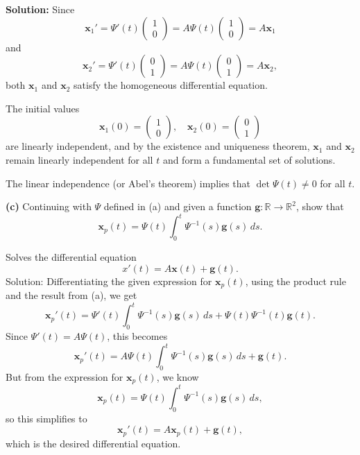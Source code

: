 \documentclass[10pt,landscape]{article}
\newcommand{\mbf}{\mathbf}
\begin{document}
\begin{multicols}{2}
\textbf{Solution:}  
Since\\
\[
\mbf{x}_1' = \Psi'(t) \begin{pmatrix} 1 \\ 0 \end{pmatrix} = A \Psi(t) \begin{pmatrix} 1 \\ 0 \end{pmatrix} = A \mbf{x}_1
\]
and\\
\[
\mbf{x}_2' = \Psi'(t) \begin{pmatrix} 0 \\ 1 \end{pmatrix} = A \Psi(t) \begin{pmatrix} 0 \\ 1 \end{pmatrix} = A \mbf{x}_2,
\]
both \( \mbf{x}_1 \) and \( \mbf{x}_2 \) satisfy the homogeneous differential equation.  

The initial values\\
\[
\mbf{x}_1(0) = \begin{pmatrix} 1 \\ 0 \end{pmatrix}, \quad \mbf{x}_2(0) = \begin{pmatrix} 0 \\ 1 \end{pmatrix}
\]
are linearly independent, and by the existence and uniqueness theorem, \( \mbf{x}_1 \) and \( \mbf{x}_2 \) remain linearly independent for all \( t \) and form a fundamental set of solutions.

The linear independence (or Abel’s theorem) implies that \( \det \Psi(t) \neq 0 \) for all \( t \).

\textbf{(c)} Continuing with \( \Psi \) defined in (a) and given a function \( \mbf{g}: \mathbb{R} \to \mathbb{R}^2 \), show that\\
\[
\mbf{x}_p(t) = \Psi(t) \int_0^t \Psi^{-1}(s) \mbf{g}(s) \, ds.
\]

Solves the differential equation\\
\[
x'(t) = A \mbf{x}(t) + \mathbf{g}(t).
\]
Solution:  
Differentiating the given expression for \( \mbf{x}_p(t) \), using the product rule and the result from (a), we get\\
\[
\mbf{x}_p'(t) = \Psi'(t) \int_0^t \Psi^{-1}(s) \mathbf{g}(s) \, ds + \Psi(t) \Psi^{-1}(t) \mathbf{g}(t).
\]
Since \( \Psi'(t) = A \Psi(t) \), this becomes\\
\[
\mbf{x}_p'(t) = A \Psi(t) \int_0^t \Psi^{-1}(s) \mathbf{g}(s) \, ds + \mathbf{g}(t).
\]
But from the expression for \( \mbf{x}_p(t) \), we know\\
\[
\mbf{x}_p(t) = \Psi(t) \int_0^t \Psi^{-1}(s) \mathbf{g}(s) \, ds,
\]
so this simplifies to\\
\[
\mbf{x}_p'(t) = A \mbf{x}_p(t) + \mathbf{g}(t),
\]
which is the desired differential equation.



\end{multicols}
\end{document}
